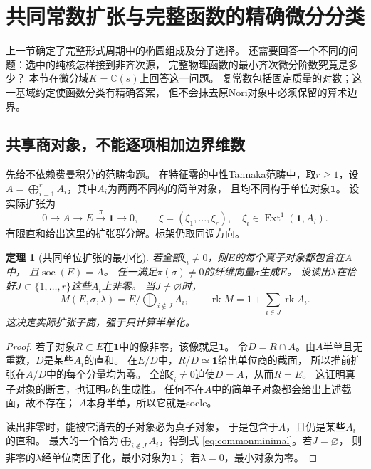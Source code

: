 \documentclass[11pt,a4paper]{ctexart}
\theoremstyle{cnplain}\newtheorem{theorem}{定理}[section]
\theoremstyle{definition}\newtheorem{definition}[theorem]{定义}
\theoremstyle{remark}\newtheorem{remark}[theorem]{注}
\newcommand{\rk}{\operatorname{rk}}\newcommand{\im}{\operatorname{im}}
\begin{document}
\section{共同常数扩张与完整函数的精确微分分类}
\label{sec:commonunit}
上一节确定了完整形式周期中的椭圆组成及分子选择。
还需要回答一个不同的问题：选中的纯核怎样接到非齐次源，
完整物理函数的最小齐次微分阶数究竟是多少？
本节在微分域$K=\mathbb C(s)$上回答这一问题。
复常数包括固定质量的对数；这一基域约定使函数分类有精确答案，
但不会抹去原Nori对象中必须保留的算术边界。

\subsection{共享商对象，不能逐项相加边界维数}
先给不依赖费曼积分的范畴命题。
在特征零的中性Tannaka范畴中，取$r\ge1$，设
$A=\bigoplus_{i=1}^r A_i$，其中$A_i$为两两不同构的简单对象，
且均不同构于单位对象$\mathbf1$。
设实际扩张为
\begin{equation}\label{eq:commonextension}
0\longrightarrow A\longrightarrow E
 \overset{\pi}{\longrightarrow}\mathbf1\longrightarrow0,
\qquad
\xi=(\xi_1,\ldots,\xi_r),\quad
\xi_i\in\operatorname{Ext}^1(\mathbf1,A_i).
\end{equation}
有限直和给出这里的扩张群分解。标架仍取同调方向。

\begin{theorem}[共同单位扩张的最小化]\label{thm:commonunit}
若全部$\xi_i\ne0$，则$E$的每个真子对象都包含在$A$中，
且$\operatorname{soc}(E)=A$。
任一满足$\pi(\sigma)\ne0$的纤维向量$\sigma$生成$E$。
设读出$\lambda$在恰好$J\subset\{1,\ldots,r\}$这些$A_i$上非零。
当$J\ne\varnothing$时，
\begin{equation}\label{eq:commonminimal}
 M(E,\sigma,\lambda)
 =E\big/\bigoplus_{i\notin J}A_i,\qquad
 \rk M=1+\sum_{i\in J}\rk A_i .
\end{equation}
这决定实际扩张子商，强于只计算半单化。
\end{theorem}
\begin{proof}
若子对象$R\subset E$在$\mathbf1$中的像非零，该像就是$\mathbf1$。
令$D=R\cap A$。由$A$半单且无重数，$D$是某些$A_i$的直和。
在$E/D$中，$R/D\simeq\mathbf1$给出单位商的截面，
所以推前扩张在$A/D$中的每个分量均为零。
全部$\xi_i\ne0$迫使$D=A$，从而$R=E$。
这证明真子对象的断言，也证明$\sigma$的生成性。
任何不在$A$中的简单子对象都会给出上述截面，故不存在；
$A$本身半单，所以它就是socle。

读出非零时，能被它消去的子对象必为真子对象，
于是包含于$A$，且仍是某些$A_i$的直和。
最大的一个恰为$\bigoplus_{i\notin J}A_i$，得到式
\eqref{eq:commonminimal}。若$J=\varnothing$，
则非零的$\lambda$经单位商因子化，最小对象为$\mathbf1$；
若$\lambda=0$，最小对象为零。
\end{proof}
\end{document}
